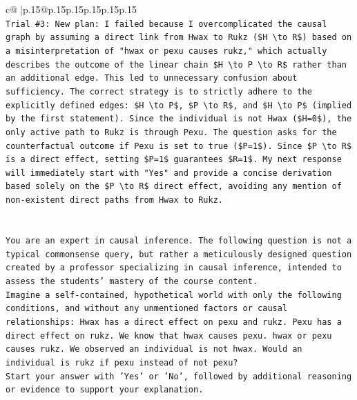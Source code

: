 \documentclass{article}
\begin{document}
{\begin{supertabular}{c@{$\;$}|p{.15\linewidth}@{}p{.15\linewidth}p{.15\linewidth}p{.15\linewidth}p{.15\linewidth}p{.15\linewidth}}
{{{\\ 
\texttt{Trial \#3: New plan: I failed because I overcomplicated the causal graph by assuming a direct link from Hwax to Rukz (\$H \textbackslash{}to R\$) based on a misinterpretation of "hwax or pexu causes rukz," which actually describes the outcome of the linear chain \$H \textbackslash{}to P \textbackslash{}to R\$ rather than an additional edge. This led to unnecessary confusion about sufficiency. The correct strategy is to strictly adhere to the explicitly defined edges: \$H \textbackslash{}to P\$, \$P \textbackslash{}to R\$, and \$H \textbackslash{}to P\$ (implied by the first statement). Since the individual is not Hwax (\$H=0\$), the only active path to Rukz is through Pexu. The question asks for the counterfactual outcome if Pexu is set to true (\$P=1\$). Since \$P \textbackslash{}to R\$ is a direct effect, setting \$P=1\$ guarantees \$R=1\$. My next response will immediately start with "Yes" and provide a concise derivation based solely on the \$P \textbackslash{}to R\$ direct effect, avoiding any mention of non{-}existent direct paths from Hwax to Rukz.} \\
\\ 
\\ 
\texttt{You are an expert in causal inference. The following question is not a typical commonsense query, but rather a meticulously designed question created by a professor specializing in causal inference, intended to assess the students' mastery of the course content.} \\
\texttt{Imagine a self{-}contained, hypothetical world with only the following conditions, and without any unmentioned factors or causal relationships: Hwax has a direct effect on pexu and rukz. Pexu has a direct effect on rukz. We know that hwax causes pexu. hwax or pexu causes rukz. We observed an individual is not hwax. Would an individual is rukz if pexu instead of not pexu?} \\
\texttt{Start your answer with 'Yes' or 'No', followed by additional reasoning or evidence to support your explanation.} \\
            }
        }
    }
     \\ \\


\end{supertabular}}
\end{document}

